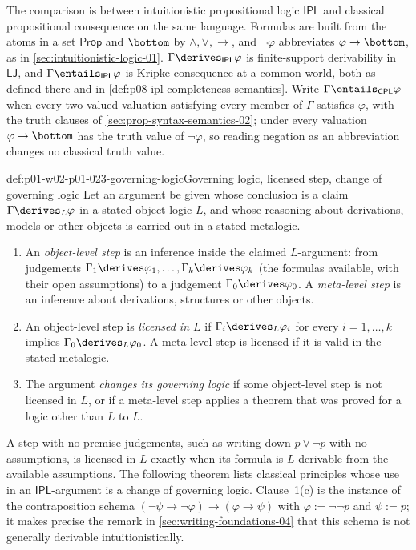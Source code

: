 The comparison is between intuitionistic propositional logic
\(\mathsf{IPL}\) and classical propositional consequence on the same
language. Formulas are built from the atoms in a set \(\mathsf{Prop}\) and
\(\bottom\) by \(\land,\lor,\to\), and \(\neg\varphi\) abbreviates
\(\varphi\to\bottom\), as in \cref{sec:intuitionistic-logic-01}.
\(\Gamma\derives_{\mathsf{IPL}}\varphi\) is finite-support derivability in
\(\mathsf{LJ}\), and \(\Gamma\entails_{\mathsf{IPL}}\varphi\) is Kripke
consequence at a common world, both as defined there and in
\cref{def:p08-ipl-completeness-semantics}. Write
\(\Gamma\entails_{\mathsf{CPL}}\varphi\) when every two-valued valuation
satisfying every member of \(\Gamma\) satisfies \(\varphi\), with the
truth clauses of \cref{sec:prop-syntax-semantics-02}; under every valuation
\(\varphi\to\bottom\) has the truth value of \(\neg\varphi\), so reading
negation as an abbreviation changes no classical truth value.

\begin{hbdefinition}{def:p01-w02-p01-023-governing-logic}{Governing logic, licensed step, change of governing logic}
Let an argument be given whose conclusion is a claim
\(\Gamma\derives_{L}\varphi\) in a stated object logic \(L\), and whose
reasoning about derivations, models or other objects is carried out in a
stated metalogic.
\begin{enumerate}
  \item An \emph{object-level step} is an inference inside the claimed
        \(L\)-argument: from judgements
        \(\Gamma_1\derives\varphi_1,\ldots,\Gamma_k\derives\varphi_k\) (the
        formulas available, with their open assumptions) to a judgement
        \(\Gamma_0\derives\varphi_0\). A \emph{meta-level step} is an
        inference about derivations, structures or other objects.
  \item An object-level step is \emph{licensed in \(L\)} if
        \(\Gamma_i\derives_{L}\varphi_i\) for every \(i=1,\ldots,k\) implies
        \(\Gamma_0\derives_{L}\varphi_0\). A meta-level step is licensed if
        it is valid in the stated metalogic.
  \item The argument \emph{changes its governing logic} if some
        object-level step is not licensed in \(L\), or if a meta-level step
        applies a theorem that was proved for a logic other than \(L\) to
        \(L\).
\end{enumerate}
\end{hbdefinition}

A step with no premise judgements, such as writing down \(p\lor\neg p\) with
no assumptions, is licensed in \(L\) exactly when its formula is
\(L\)-derivable from the available assumptions. The following theorem lists
classical principles whose use in an \(\mathsf{IPL}\)-argument is a change of
governing logic. Clause~1(c) is the instance of the contraposition schema
\((\neg\psi\to\neg\varphi)\to(\varphi\to\psi)\) with
\(\varphi:=\neg\neg p\) and \(\psi:=p\); it makes precise the remark in
\cref{sec:writing-foundations-04} that this schema is not generally
derivable intuitionistically.


